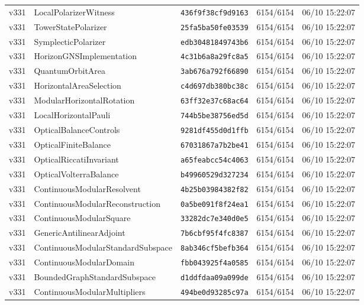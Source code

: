 \documentclass[11pt]{article}
\theoremstyle{definition}\newtheorem{deriv}{Derivação}
\begin{document}
{\begin{longtable}{@{}lllll@{}}
v331 & LocalPolarizerWitness & \texttt{436f9f38cf9d9163} & 6154/6154 & 06/10 15:22:07 \\
v331 & TowerStatePolarizer & \texttt{25fa5ba50fe03539} & 6154/6154 & 06/10 15:22:07 \\
v331 & SymplecticPolarizer & \texttt{edb30481849743b6} & 6154/6154 & 06/10 15:22:07 \\
v331 & HorizonGNSImplementation & \texttt{4c31b6a8a29fc8a5} & 6154/6154 & 06/10 15:22:07 \\
v331 & QuantumOrbitArea & \texttt{3ab676a792f66890} & 6154/6154 & 06/10 15:22:07 \\
v331 & HorizontalAreaSelection & \texttt{c4d697db380bc38c} & 6154/6154 & 06/10 15:22:07 \\
v331 & ModularHorizontalRotation & \texttt{63ff32e37c68ac64} & 6154/6154 & 06/10 15:22:07 \\
v331 & LocalHorizontalPauli & \texttt{744b5be38756ed5d} & 6154/6154 & 06/10 15:22:07 \\
v331 & OpticalBalanceControls & \texttt{9281df455d0d1ffb} & 6154/6154 & 06/10 15:22:07 \\
v331 & OpticalFiniteBalance & \texttt{67031867a7b2be41} & 6154/6154 & 06/10 15:22:07 \\
v331 & OpticalRiccatiInvariant & \texttt{a65feabcc54c4063} & 6154/6154 & 06/10 15:22:07 \\
v331 & OpticalVolterraBalance & \texttt{b49960529d327234} & 6154/6154 & 06/10 15:22:07 \\
v331 & ContinuousModularResolvent & \texttt{4b25b03984382f82} & 6154/6154 & 06/10 15:22:07 \\
v331 & ContinuousModularReconstruction & \texttt{0a5be091f8f24ea1} & 6154/6154 & 06/10 15:22:07 \\
v331 & ContinuousModularSquare & \texttt{33282dc7e340d0e5} & 6154/6154 & 06/10 15:22:07 \\
v331 & GenericAntilinearAdjoint & \texttt{7b6cbf95f4fc8387} & 6154/6154 & 06/10 15:22:07 \\
v331 & ContinuousModularStandardSubspace & \texttt{8ab346cf5befb364} & 6154/6154 & 06/10 15:22:07 \\
v331 & ContinuousModularDomain & \texttt{fbb043925f4a0585} & 6154/6154 & 06/10 15:22:07 \\
v331 & BoundedGraphStandardSubspace & \texttt{d1ddfdaa09a099de} & 6154/6154 & 06/10 15:22:07 \\
v331 & ContinuousModularMultipliers & \texttt{494be0d93285c97a} & 6154/6154 & 06/10 15:22:07 \\

\end{longtable}}
\end{document}
